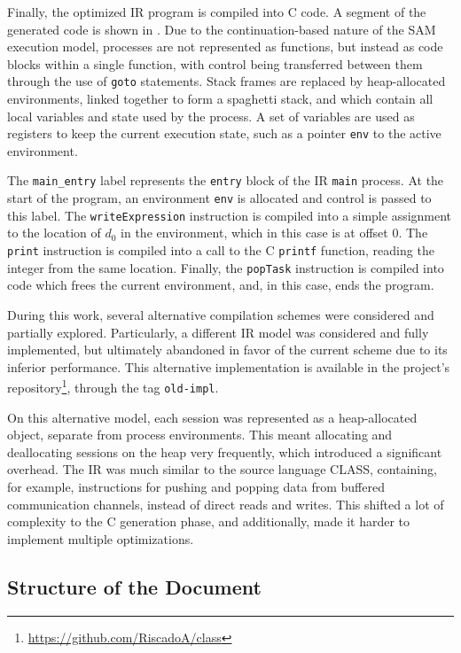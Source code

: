 Finally, the optimized \ac{IR} program is compiled into C code. A segment of the generated code is shown in . Due to the continuation-based nature of the \ac{SAM} execution model, processes are not represented as functions, but instead as code blocks within a single function, with control being transferred between them through the use of \texttt{goto} statements. Stack frames are replaced by heap-allocated environments, linked together to form a spaghetti stack, and which contain all local variables and state used by the process. A set of variables are used as registers to keep the current execution state, such as a pointer \texttt{env} to the active environment.

The \texttt{main\_entry} label represents the \texttt{entry} block of the \ac{IR} \texttt{main} process. At the start of the program, an environment \texttt{env} is allocated and control is passed to this label. The \texttt{writeExpression} instruction is compiled into a simple assignment to the location of $d_0$ in the environment, which in this case is at offset $0$. The \texttt{print} instruction is compiled into a call to the C \texttt{printf} function, reading the integer from the same location. Finally, the \texttt{popTask} instruction is compiled into code which frees the current environment, and, in this case, ends the program.

During this work, several alternative compilation schemes were considered and partially explored. Particularly, a different \ac{IR} model was considered and fully implemented, but ultimately abandoned in favor of the current scheme due to its inferior performance. This alternative implementation is available in the project's repository\footnote{\url{https://github.com/RiscadoA/class}}, through the tag \texttt{old-impl}.

On this alternative model, each session was represented as a heap-allocated object, separate from process environments. This meant allocating and deallocating sessions on the heap very frequently, which introduced a significant overhead. The \ac{IR} was much similar to the source language \ac{CLASS}, containing, for example, instructions for pushing and popping data from buffered communication channels, instead of direct reads and writes. This shifted a lot of complexity to the C generation phase, and additionally, made it harder to implement multiple optimizations.

\subsection{Structure of the Document}

